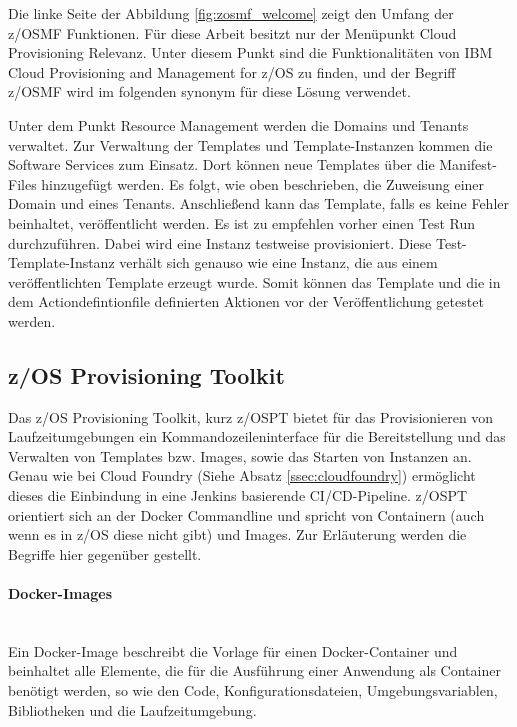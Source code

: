 Die linke Seite der Abbildung \ref{fig:zosmf_welcome} zeigt den Umfang der z/OSMF  Funktionen.
Für diese Arbeit besitzt nur der Menüpunkt \glqq Cloud Provisioning\grqq{} Relevanz.
Unter diesem Punkt sind die Funktionalitäten von \glqq IBM Cloud Provisioning and Management for z/OS\grqq{} zu finden, und der Begriff  \glqq z/OSMF\grqq{} wird im folgenden synonym für diese Lösung verwendet.
\cite[S. 32]{Rotthove.2018}

Unter dem Punkt \glqq Resource Management\grqq{} werden die Domains und Tenants verwaltet.
Zur Verwaltung der Templates und Template-Instanzen kommen die \glqq Software Services\grqq{} zum Einsatz.
Dort können neue Templates über die Manifest-Files hinzugefügt werden.
Es folgt, wie oben beschrieben, die Zuweisung einer \glqq Domain\grqq{} und eines \glqq Tenants\grqq{}.
Anschließend kann das Template, falls es keine Fehler beinhaltet, veröffentlicht werden.
Es ist zu empfehlen vorher einen \glqq Test Run\grqq{} durchzuführen.
Dabei wird eine Instanz testweise provisioniert.
Diese Test-Template-Instanz verhält sich genauso wie eine Instanz, die aus einem veröffentlichten Template erzeugt wurde. 
Somit können das Template und die in dem Actiondefintionfile definierten Aktionen vor der Veröffentlichung getestet werden.
\cite[S. 8]{Rotthove.2018}


\subsection{z/OS Provisioning Toolkit}\label{sssec:zospt}
Das z/OS Provisioning Toolkit, kurz z/OSPT bietet für das Provisionieren von Laufzeitumgebungen ein Kommandozeileninterface für die Bereitstellung und das Verwalten von Templates bzw. \glqq Images\grqq, sowie das Starten von Instanzen an.
Genau wie bei Cloud Foundry (Siehe Absatz \ref{ssec:cloudfoundry}) ermöglicht dieses die Einbindung in eine Jenkins basierende CI/CD-Pipeline.
z/OSPT orientiert sich an der Docker Commandline und spricht von Containern (auch wenn es in z/OS diese nicht gibt) und Images.
Zur Erläuterung werden die Begriffe hier  gegenüber gestellt.

\paragraph{\glqq Docker-Images\grqq}~\\
Ein Docker-Image beschreibt die Vorlage für einen Docker-Container und beinhaltet alle Elemente, die für die Ausführung einer Anwendung als Container benötigt werden, so wie den Code, Konfigurationsdateien, Umgebungsvariablen, Bibliotheken und die Laufzeitumgebung.

